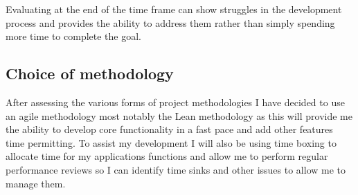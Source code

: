 Evaluating at the end of the time frame can show struggles in the
development process and provides the ability to address them rather than
simply spending more time to complete the goal.

\subsection{Choice of methodology}\label{choice-of-methodology}

After assessing the various forms of project methodologies I have
decided to use an agile methodology most notably the Lean methodology as
this will provide me the ability to develop core functionality in a fast
pace and add other features time permitting. To assist my development I
will also be using time boxing to allocate time for my applications
functions and allow me to perform regular performance reviews so I can
identify time sinks and other issues to allow me to manage them.
